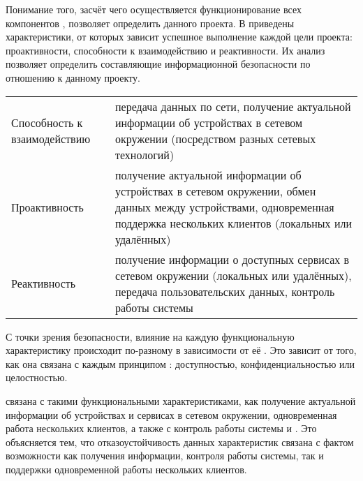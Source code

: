 %
Понимание того, засчёт чего осуществляется функционирование всех компонентов , позволяет определить  данного проекта. 
%
В  приведены характеристики, от которых зависит успешное выполнение каждой цели проекта: проактивности, способности к взаимодействию и реактивности. 
%
Их анализ позволяет определить составляющие информационной безопасности по отношению к данному проекту. 

 {
	\begin{tabular}{ | p{6cm} | p{8cm} | }
	  \hline                       
	  \Bold{Цель} & \Bold{Характеристики} \\ \hline
	  Способность к взаимодействию & передача данных по сети, \linebreak получение актуальной информации об устройствах в сетевом окружении (посредством разных сетевых технологий) \\ \hline
	  Проактивность & получение актуальной информации об устройствах в сетевом окружении, \linebreak обмен данных между устройствами, \linebreak одновременная поддержка нескольких клиентов (локальных или удалённых) \\ \hline
	  Реактивность & получение информации о доступных сервисах в сетевом окружении (локальных или удалённых), \linebreak передача пользовательских данных, \linebreak контроль работы системы \\ \hline
	\end{tabular}
}

%
С точки зрения безопасности, влияние на каждую функциональную характеристику происходит по-разному в зависимости от её . 
%
Это зависит от того, как она связана с каждым принципом : доступностью, конфиденциальностью или целостностью. 

%
 связана с такими функциональными характеристиками, как получение актуальной информации об устройствах и сервисах в сетевом окружении, одновременная работа нескольких клиентов, а также с контроль работы системы и . 
%
Это объясняется тем, что отказоустойчивость данных характеристик связана с фактом возможности как получения информации, контроля работы системы, так и поддержки одновременной работы нескольких клиентов. 

